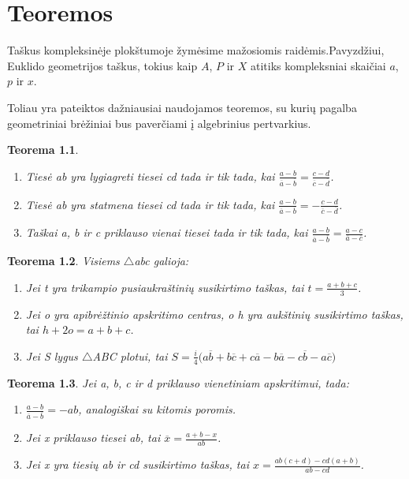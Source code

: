\documentclass[11pt,a4paper,twoside]{book}
\newtheorem{thmnr}{Teorema}
\theoremstyle{definition} \newtheorem*{api}{Apibrėžimas}
\theoremstyle{remark} \newtheorem*{pastaba}{Pastaba}
\begin{document}
\chapter{Teoremos}

Taškus kompleksinėje plokštumoje žymėsime mažosiomis raidėmis.Pavyzdžiui, 
Euklido geometrijos taškus, tokius kaip $A$, $P$ ir $X$ atitiks kompleksniai skaičiai $a$, $p$ ir $x$.

Toliau yra pateiktos dažniausiai naudojamos teoremos, su kurių pagalba
geometriniai brėžiniai bus paverčiami į algebrinius pertvarkius.

\begin{thmnr}\ 
\begin{enumerate}
\item Tiesė ab yra lygiagreti tiesei cd tada ir tik tada, kai $\frac{a - b}{\overline{a} -\overline{b}}=\frac{c - d}{\overline{c} - \overline{d}}$.
\item Tiesė ab yra statmena tiesei cd tada ir tik tada, kai $\frac{a - b}{\overline{a} -\overline{b}}=-\frac{c - d}{\overline{c} - \overline{d}}$.
\item Taškai a, b ir c priklauso vienai tiesei tada ir tik tada, kai $\frac{a - b}{\overline{a} -\overline{b}}=\frac{a-c}{\overline{a} - \overline{c}}$.
\end{enumerate}
\end{thmnr}

\begin{thmnr} Visiems $\bigtriangleup$abc galioja:\
\begin{enumerate}
\item Jei t yra trikampio pusiaukraštinių susikirtimo taškas, tai $t=\frac{a+b+c}{3}$.
\item Jei o yra apibrėžtinio apskritimo centras, o h yra aukštinių susikirtimo taškas, tai $h+2o=a+b+c$.
\item Jei S lygus $\bigtriangleup$ABC plotui, tai 
$S=\tfrac{i}{4}\Big(a\overline{b} +b\overline{c}+c\overline{a} - b\overline{a} -c\overline{b}-a\overline{c}\Big)$
\end{enumerate}
\end{thmnr}

\begin{thmnr}  Jei a, b, c ir d priklauso vienetiniam apskritimui, tada:\
\begin{enumerate}
\item $\frac{a - b}{\overline{a} -\overline{b}}=-ab$, analogiškai su kitomis poromis.
\item Jei x priklauso tiesei ab, tai $\overline{x}=\frac{a + b - x}{ab}$.
\item Jei x yra tiesių ab ir cd susikirtimo taškas, tai $x=\frac{ab(c+d) - cd(a+b)}{ab - cd}$.
\end{enumerate}
\end{thmnr}
\end{document}
